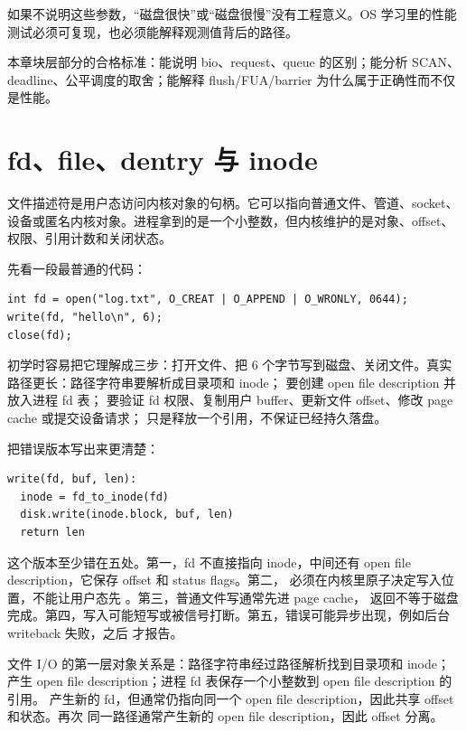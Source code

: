 如果不说明这些参数，“磁盘很快”或“磁盘很慢”没有工程意义。OS 学习里的性能测试必须可复现，也必须能解释观测值背后的路径。

\begin{warningbox}
本章块层部分的合格标准：能说明 bio、request、queue 的区别；能分析 SCAN、deadline、公平调度的取舍；能解释 flush/FUA/barrier 为什么属于正确性而不仅是性能。
\end{warningbox}

\section{fd、file、dentry 与 inode}

文件描述符是用户态访问内核对象的句柄。它可以指向普通文件、管道、socket、设备或匿名内核对象。进程拿到的是一个小整数，但内核维护的是对象、offset、权限、引用计数和关闭状态。

先看一段最普通的代码：

\begin{lstlisting}
int fd = open("log.txt", O_CREAT | O_APPEND | O_WRONLY, 0644);
write(fd, "hello\n", 6);
close(fd);
\end{lstlisting}

初学时容易把它理解成三步：打开文件、把 6 个字节写到磁盘、关闭文件。真实路径更长：路径字符串要解析成目录项和 inode； 要创建 open file description 并放入进程 fd 表； 要验证 fd 权限、复制用户 buffer、更新文件 offset、修改 page cache 或提交设备请求； 只是释放一个引用，不保证已经持久落盘。

把错误版本写出来更清楚：

\begin{lstlisting}
write(fd, buf, len):
  inode = fd_to_inode(fd)
  disk.write(inode.block, buf, len)
  return len
\end{lstlisting}

这个版本至少错在五处。第一，fd 不直接指向 inode，中间还有 open file description，它保存 offset 和 status flags。第二， 必须在内核里原子决定写入位置，不能让用户态先 。第三，普通文件写通常先进 page cache， 返回不等于磁盘完成。第四，写入可能短写或被信号打断。第五，错误可能异步出现，例如后台 writeback 失败，之后  才报告。

文件 I/O 的第一层对象关系是：路径字符串经过路径解析找到目录项和 inode； 产生 open file description；进程 fd 表保存一个小整数到 open file description 的引用。 产生新的 fd，但通常仍指向同一个 open file description，因此共享 offset 和状态。再次  同一路径通常产生新的 open file description，因此 offset 分离。

